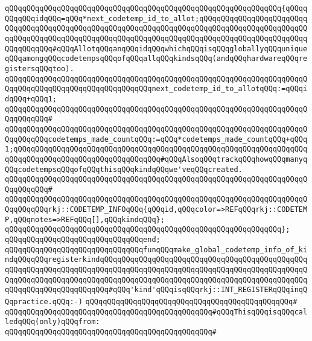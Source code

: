 \verb|qQQqqQQqqQQqqQQqqQQqqQQqqQQqqQQqqQQqqQQqqQQqqQQqqQQqqQQqqQQqqQQq{qQQqqQQqqQQqidqQQq=qQQq*next_codetemp_id_to_allot;qQQqqQQqqQQqqQQqqQQqqQQqqQQqqQQqqQQqqQQqqQQqqQQqqQQqqQQqqQQqqQQqqQQqqQQqqQQqqQQqqQQqqQQqqQQqqQQqqQQqqQQqqQQqqQQqqQQqqQQqqQQqqQQqqQQqqQQqqQQqqQQqqQQqqQQqqQQqqQQqqQQqqQQqqQQqqQQq#qQQqAllotqQQqanqQQqidqQQqwhichqQQqisqQQqgloballyqQQquniqueqQQqamongqQQqcodetempsqQQqofqQQqallqQQqkindsqQQq(andqQQqhardwareqQQqregistersqQQqtoo).|\newline
\verb|qQQqqQQqqQQqqQQqqQQqqQQqqQQqqQQqqQQqqQQqqQQqqQQqqQQqqQQqqQQqqQQqqQQqqQQqqQQqqQQqqQQqqQQqqQQqqQQqqQQqqQQqnext_codetemp_id_to_allotqQQq:=qQQqidqQQq+qQQq1;|\newline
\verb|qQQqqQQqqQQqqQQqqQQqqQQqqQQqqQQqqQQqqQQqqQQqqQQqqQQqqQQqqQQqqQQqqQQqqQQqqQQqqQQq#|\newline
\verb|qQQqqQQqqQQqqQQqqQQqqQQqqQQqqQQqqQQqqQQqqQQqqQQqqQQqqQQqqQQqqQQqqQQqqQQqqQQqqQQqcodetemps_made_countqQQq:=qQQq*codetemps_made_countqQQq+qQQq1;qQQqqQQqqQQqqQQqqQQqqQQqqQQqqQQqqQQqqQQqqQQqqQQqqQQqqQQqqQQqqQQqqQQqqQQqqQQqqQQqqQQqqQQqqQQqqQQqqQQqqQQq#qQQqAlsoqQQqtrackqQQqhowqQQqmanyqQQqcodetempsqQQqofqQQqthisqQQqkindqQQqwe'veqQQqcreated.|\newline
\verb|qQQqqQQqqQQqqQQqqQQqqQQqqQQqqQQqqQQqqQQqqQQqqQQqqQQqqQQqqQQqqQQqqQQqqQQqqQQqqQQq#|\newline
\verb|qQQqqQQqqQQqqQQqqQQqqQQqqQQqqQQqqQQqqQQqqQQqqQQqqQQqqQQqqQQqqQQqqQQqqQQqqQQqqQQqrkj::CODETEMP_INFOqQQq{qQQqid,qQQqcolor=>REFqQQqrkj::CODETEMP,qQQqnotes=>REFqQQq[],qQQqkindqQQq};|\newline
\verb|qQQqqQQqqQQqqQQqqQQqqQQqqQQqqQQqqQQqqQQqqQQqqQQqqQQqqQQqqQQqqQQq};|\newline
\verb|qQQqqQQqqQQqqQQqqQQqqQQqqQQqqQQqend;|\newline
\newline
\verb|qQQqqQQqqQQqqQQqqQQqqQQqqQQqqQQqfunqQQqmake_global_codetemp_info_of_kindqQQqqQQqregisterkindqQQqqQQqqQQqqQQqqQQqqQQqqQQqqQQqqQQqqQQqqQQqqQQqqQQqqQQqqQQqqQQqqQQqqQQqqQQqqQQqqQQqqQQqqQQqqQQqqQQqqQQqqQQqqQQqqQQqqQQqqQQqqQQqqQQqqQQqqQQqqQQqqQQqqQQqqQQqqQQqqQQqqQQqqQQqqQQqqQQqqQQqqQQqqQQqqQQqqQQqqQQqqQQqqQQq#qQQq'kind'qQQqisqQQqrkj::INT_REGISTERqQQqinqQQqpractice.qQQq:-)|\newline
\verb|qQQqqQQqqQQqqQQqqQQqqQQqqQQqqQQqqQQqqQQqqQQqqQQq#|\newline
\verb|qQQqqQQqqQQqqQQqqQQqqQQqqQQqqQQqqQQqqQQqqQQqqQQq#qQQqThisqQQqisqQQqcalledqQQq(only)qQQqfrom:|\newline
\verb|qQQqqQQqqQQqqQQqqQQqqQQqqQQqqQQqqQQqqQQqqQQqqQQq#|\newline
